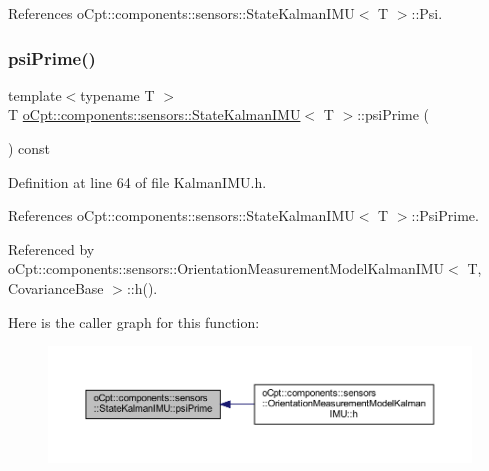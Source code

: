 References o\+Cpt\+::components\+::sensors\+::\+State\+Kalman\+I\+M\+U$<$ T $>$\+::\+Psi.

\hypertarget{classo_cpt_1_1components_1_1sensors_1_1_state_kalman_i_m_u_a33afe8c39e6296b28e4575e03214dc5c}{}\label{classo_cpt_1_1components_1_1sensors_1_1_state_kalman_i_m_u_a33afe8c39e6296b28e4575e03214dc5c} 
\subsubsection{\texorpdfstring{psi\+Prime()}{psiPrime()}\hspace{0.1cm}{\footnotesize\ttfamily [1/2]}}
{\footnotesize\ttfamily template$<$typename T $>$ \\
T \hyperlink{classo_cpt_1_1components_1_1sensors_1_1_state_kalman_i_m_u}{o\+Cpt\+::components\+::sensors\+::\+State\+Kalman\+I\+MU}$<$ T $>$\+::psi\+Prime (\begin{DoxyParamCaption}{ }\end{DoxyParamCaption}) const\hspace{0.3cm}{\ttfamily [inline]}}



Definition at line 64 of file Kalman\+I\+M\+U.\+h.



References o\+Cpt\+::components\+::sensors\+::\+State\+Kalman\+I\+M\+U$<$ T $>$\+::\+Psi\+Prime.



Referenced by o\+Cpt\+::components\+::sensors\+::\+Orientation\+Measurement\+Model\+Kalman\+I\+M\+U$<$ T, Covariance\+Base $>$\+::h().

Here is the caller graph for this function\+:
\nopagebreak
\begin{figure}[H]
\begin{center}
\leavevmode
\includegraphics[width=350pt]{classo_cpt_1_1components_1_1sensors_1_1_state_kalman_i_m_u_a33afe8c39e6296b28e4575e03214dc5c_icgraph}
\end{center}
\end{figure}
\hypertarget{classo_cpt_1_1components_1_1sensors_1_1_state_kalman_i_m_u_a621bd8af367d41712fb05ce0728ae843}{}\label{classo_cpt_1_1components_1_1sensors_1_1_state_kalman_i_m_u_a621bd8af367d41712fb05ce0728ae843} 
